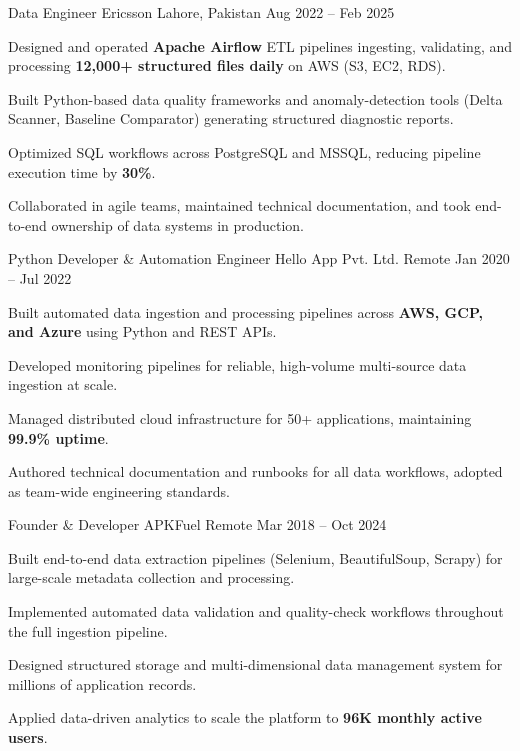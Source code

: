 \documentclass[11pt, a4paper]{awesome-cv}
\begin{document}
\begin{cventries}

\cventry
{Data Engineer}
{Ericsson}
{Lahore, Pakistan}
{Aug 2022 -- Feb 2025}
{
\begin{cvitems}
\item {Designed and operated \textbf{Apache Airflow} ETL pipelines ingesting, validating, and processing \textbf{12,000+ structured files daily} on AWS (S3, EC2, RDS).}
\item {Built Python-based data quality frameworks and anomaly-detection tools (Delta Scanner, Baseline Comparator) generating structured diagnostic reports.}
\item {Optimized SQL workflows across PostgreSQL and MSSQL, reducing pipeline execution time by \textbf{30\%}.}
\item {Collaborated in agile teams, maintained technical documentation, and took end-to-end ownership of data systems in production.}
\end{cvitems}
}

\cventry
{Python Developer \& Automation Engineer}
{Hello App Pvt. Ltd.}
{Remote}
{Jan 2020 -- Jul 2022}
{
\begin{cvitems}
\item {Built automated data ingestion and processing pipelines across \textbf{AWS, GCP, and Azure} using Python and REST APIs.}
\item {Developed monitoring pipelines for reliable, high-volume multi-source data ingestion at scale.}
\item {Managed distributed cloud infrastructure for 50+ applications, maintaining \textbf{99.9\% uptime}.}
\item {Authored technical documentation and runbooks for all data workflows, adopted as team-wide engineering standards.}
\end{cvitems}
}

\cventry
{Founder \& Developer}
{APKFuel}
{Remote}
{Mar 2018 -- Oct 2024}
{
\begin{cvitems}
\item {Built end-to-end data extraction pipelines (Selenium, BeautifulSoup, Scrapy) for large-scale metadata collection and processing.}
\item {Implemented automated data validation and quality-check workflows throughout the full ingestion pipeline.}
\item {Designed structured storage and multi-dimensional data management system for millions of application records.}
\item {Applied data-driven analytics to scale the platform to \textbf{96K monthly active users}.}
\end{cvitems}
}

\end{cventries}
\end{document}
